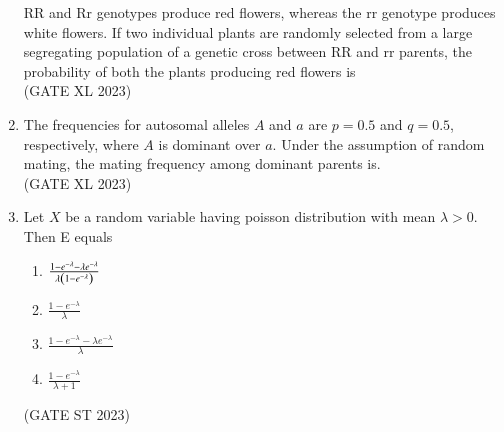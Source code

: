 \begin{enumerate}[label=\thechapter.\arabic*,ref=\thechapter.\theenumi]
RR and Rr genotypes produce red flowers, whereas the rr genotype produces
white flowers. If two individual plants are randomly selected from a large
segregating population of a genetic cross between RR and rr parents, the
probability of both the plants producing red flowers is\\
\hfill(GATE XL 2023)\\

\item The frequencies for autosomal alleles $A$ and $a$ are $p = 0.5$ and $q = 0.5$,
respectively, where $A$ is dominant over $a$. Under the assumption of random
mating, the mating frequency among dominant parents is.\\
\hfill(GATE XL 2023)\\

\item Let $X$ be a random variable having poisson distribution with mean $\lambda>0$. Then E equals
\begin{enumerate}
	\item $\frac{1-e^{-\lambda}-\lambda e^{-\lambda}}{\lambda\left(1-e^{-\lambda}\right)}$
	\item $\frac{1-e^{-\lambda}}{\lambda}$
	\item $\frac{1-e^{-\lambda}-\lambda e^{-\lambda}}{\lambda}$
	\item $\frac{1-e^{-\lambda}}{\lambda +1}$
\end{enumerate}
\hfill(GATE ST 2023)\\
\solution\\

\end{enumerate}
